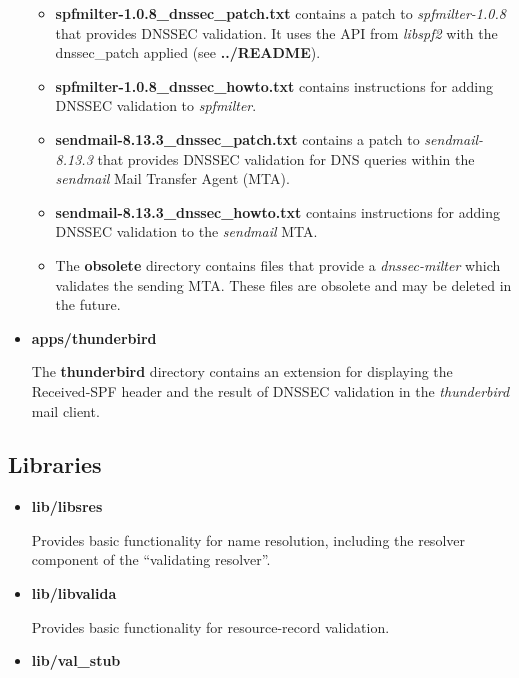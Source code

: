 \documentclass[12pt]{article}
\newcommand{\cmd}[1]{{\em #1}}
\newcommand{\lib}[1]{{\em #1}}
\newcommand{\path}[1]{{\bf #1}}
\begin{document}
\begin{itemize}
\begin{itemize}
\item \path{spfmilter-1.0.8\_dnssec\_patch.txt} contains a patch to
\cmd{spfmilter-1.0.8} that provides DNSSEC validation.  It uses the API from
\lib{libspf2} with the dnssec\_patch applied (see \path{../README}).

\item \path{spfmilter-1.0.8\_dnssec\_howto.txt} contains instructions
for adding DNSSEC validation to \cmd{spfmilter}.

\item \path{sendmail-8.13.3\_dnssec\_patch.txt} contains a patch to
\cmd{sendmail-8.13.3} that provides DNSSEC validation for DNS queries within
the \cmd{sendmail} Mail Transfer Agent (MTA).

\item \path{sendmail-8.13.3\_dnssec\_howto.txt} contains instructions
for adding DNSSEC validation to the \cmd{sendmail} MTA.

\item The \path{obsolete} directory contains files that provide a
\cmd{dnssec-milter} which validates the sending MTA.  These files
are obsolete and may be deleted in the future.

\end{itemize}

\item{\path{apps/thunderbird}}

The \path{thunderbird} directory contains an extension for displaying
the Received-SPF header and the result of DNSSEC validation in the
\cmd{thunderbird} mail client.

\end{itemize}


\subsection{Libraries}

\begin{itemize}
\item{\path{lib/libsres}}

Provides basic functionality for name resolution, including the resolver
component of the ``validating resolver''.

\item{\path{lib/libvalida}}

Provides basic functionality for resource-record validation.

\item{\path{lib/val\_stub}}

\end{itemize}
\end{document}
